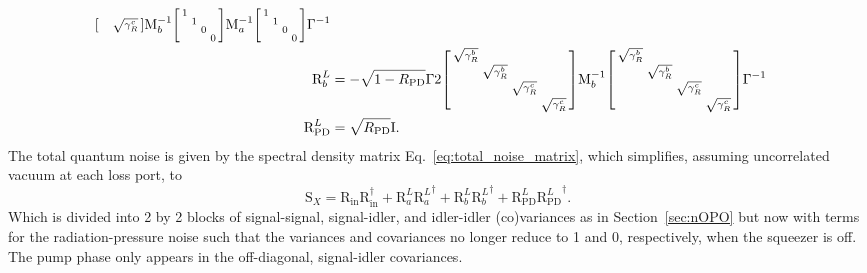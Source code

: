 \begin{align}
\begin{bsmallmatrix}
 &  &  & \sqrt{\gamma^c_R}
\end{bsmallmatrix}\text{M}_b^{-1}\begin{bsmallmatrix}
1 &  &  &  \\
 & 1 &  &  \\
 &  & 0 &  \\
 &  &  & 0
\end{bsmallmatrix}\text{M}_a^{-1}\begin{bsmallmatrix}
1 &  &  &  \\
 & 1 &  &  \\
 &  & 0 &  \\
 &  &  & 0
\end{bsmallmatrix}\Gamma^{-1}\\
\text{R}^L_b&=-\sqrt{1-R_\text{PD}}\Gamma 2\begin{bsmallmatrix}
\sqrt{\gamma^b_R} &  &  &  \\
 & \sqrt{\gamma^b_R} &  &  \\
 &  & \sqrt{\gamma^c_R} &  \\
 &  &  & \sqrt{\gamma^c_R}
\end{bsmallmatrix}\text{M}_b^{-1}\begin{bsmallmatrix}
\sqrt{\gamma^b_R} &  &  &  \\
 & \sqrt{\gamma^b_R} &  &  \\
 &  & \sqrt{\gamma^c_R} &  \\
 &  &  & \sqrt{\gamma^c_R}
\end{bsmallmatrix}\Gamma^{-1}\\
\text{R}^L_\text{PD}&=\sqrt{R_\text{PD}} \text{I}.
\end{align}
\endgroup
The total quantum noise is given by the spectral density matrix Eq.~\ref{eq:total_noise_matrix}, which simplifies, assuming uncorrelated vacuum at each loss port, to
\begin{equation}\label{eq:nIS_Sx}
\text{S}_X=\text{R}_\text{in}\text{R}_\text{in}^\dag+\text{R}^L_a{\text{R}^L_a}^\dag+\text{R}^L_b{\text{R}^L_b}^\dag+\text{R}^L_\text{PD}{\text{R}^L_\text{PD}}^\dag.
\end{equation} %
Which is divided into 2 by 2 blocks of signal-signal, signal-idler, and idler-idler (co)variances as in Section~\ref{sec:nOPO}  but now with terms for the radiation-pressure noise such that the variances and covariances no longer reduce to 1 and 0, respectively, when the squeezer is off. The pump phase only appears in the off-diagonal, signal-idler covariances.
